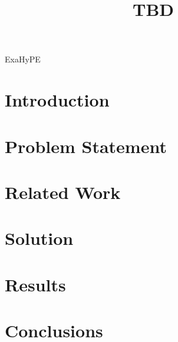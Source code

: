 \documentclass[12pt,a4paper]{article}
\title{TBD}
\author{} %
\date{}
\newif\iftesting
\newcommand{\testingbreak}{\iftesting \pagebreak \fi}%
\begin{document}
\maketitle

\begin{abstract}

\end{abstract}

\begin{keywords}
ExaHyPE
\end{keywords}

\testingbreak
\section{Introduction}


\testingbreak
\section{Problem Statement}\label{sec:problem_statement}


\testingbreak
\section{Related Work}



\testingbreak
\section{Solution}
\label{sec:methodology}

%

\testingbreak
\section{Results}
\label{sec:results}


\testingbreak
\section{Conclusions}


\testingbreak
%
\printbibliography

\iftesting
\pagebreak

\fi
\end{document}
